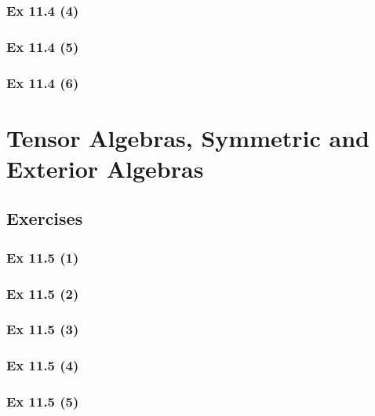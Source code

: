 \subsubsection{Ex 11.4 (4)}\label{sec:Ex_11.4.4}

\subsubsection{Ex 11.4 (5)}\label{sec:Ex_11.4.5}

\subsubsection{Ex 11.4 (6)}\label{sec:Ex_11.4.6}

\newpage		%

\section{Tensor Algebras, Symmetric and\\ Exterior Algebras}\label{sec:11.5}	
\subsection*{Exercises}\label{sec:11.5_Exercises}

\subsubsection{Ex 11.5 (1)}\label{sec:Ex_11.5.1}

\subsubsection{Ex 11.5 (2)}\label{sec:Ex_11.5.2}

\subsubsection{Ex 11.5 (3)}\label{sec:Ex_11.5.3}

\subsubsection{Ex 11.5 (4)}\label{sec:Ex_11.5.4}

\subsubsection{Ex 11.5 (5)}\label{sec:Ex_11.5.5}

